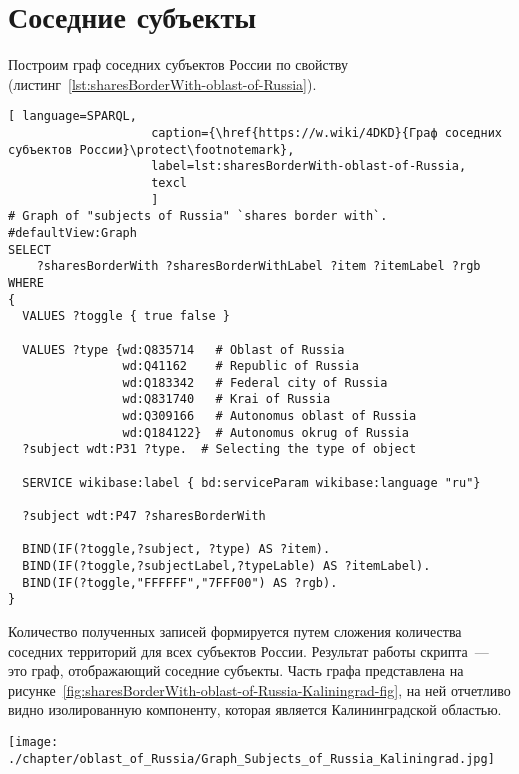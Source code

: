 \section{Соседние субъекты}

Построим граф соседних субъектов России по свойству  (листинг~\protect\ref{lst:sharesBorderWith-oblast-of-Russia}).

\begin{lstlisting}[ language=SPARQL, 
                    caption={\href{https://w.wiki/4DKD}{Граф соседних субъектов России}\protect\footnotemark},
                    label=lst:sharesBorderWith-oblast-of-Russia,
                    texcl 
                    ]
# Graph of "subjects of Russia" `shares border with`. 
#defaultView:Graph
SELECT 
    ?sharesBorderWith ?sharesBorderWithLabel ?item ?itemLabel ?rgb
WHERE
{
  VALUES ?toggle { true false }
  
  VALUES ?type {wd:Q835714   # Oblast of Russia
                wd:Q41162    # Republic of Russia
                wd:Q183342   # Federal city of Russia
                wd:Q831740   # Krai of Russia
                wd:Q309166   # Autonomus oblast of Russia
                wd:Q184122}  # Autonomus okrug of Russia
  ?subject wdt:P31 ?type.  # Selecting the type of object  
  
  SERVICE wikibase:label { bd:serviceParam wikibase:language "ru"}
  
  ?subject wdt:P47 ?sharesBorderWith   
           
  BIND(IF(?toggle,?subject, ?type) AS ?item).
  BIND(IF(?toggle,?subjectLabel,?typeLable) AS ?itemLabel).
  BIND(IF(?toggle,"FFFFFF","7FFF00") AS ?rgb).
}
\end{lstlisting}%

Количество полученных записей формируется путем сложения количества соседних территорий для всех субъектов России. Результат работы скрипта~--- это граф, отображающий соседние субъекты. Часть графа представлена на рисунке~\ref{fig:sharesBorderWith-oblast-of-Russia-Kaliningrad-fig}, на ней отчетливо видно изолированную компоненту, которая является Калининградской областью.
\begin{figure*}[!h]
    \texttt{[image: ./chapter/oblast\_of\_Russia/Graph\_Subjects\_of\_Russia\_Kaliningrad.jpg]}
	\caption[Граф субъектов России. Калининград, 2021.]{Граф субъектов России. Калининград, 2021. Граф построен на основе данных, полученных с помощью запроса~\protect\ref{lst:sharesBorderWith-oblast-of-Russia}.}%
	\label{fig:sharesBorderWith-oblast-of-Russia-Kaliningrad-fig}%
\end{figure*}

